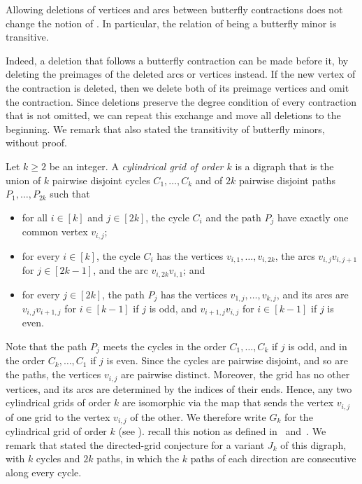 \documentclass[fontsize=12pt,leading=14pt]{fullpaper}
\begin{document}
\begin{observation}\label{par:butterfly-compose}
  Allowing deletions of vertices and arcs between butterfly contractions does not change the notion of .
  In particular, the relation of being a butterfly minor is transitive.
\end{observation}

Indeed, a deletion that follows a butterfly contraction can be made before it, by deleting the preimages of the deleted arcs or vertices instead.
If the new vertex of the contraction is deleted, then we delete both of its preimage vertices and omit the contraction.
Since deletions preserve the degree condition of every contraction that is not omitted, we can repeat this exchange and move all deletions to the beginning.
We remark that \textcite[Observation~4]{Reich26} also stated the transitivity of butterfly minors, without proof.

\begin{definition}\label{def:cyl-grid}
  Let $k\ge2$ be an integer.
  A \emph{cylindrical grid of order $k$} is a digraph that is the union of $k$ pairwise disjoint cycles $C_1,\dots,C_k$ and of $2k$ pairwise disjoint paths $P_1,\dots,P_{2k}$ such that
  \begin{itemize}
    \item for all $i\in[k]$ and $j\in[2k]$, the cycle $C_i$ and the path $P_j$ have exactly one common vertex $v_{i,j}$;
    \item for every $i\in[k]$, the cycle $C_i$ has the vertices $v_{i,1},\dots,v_{i,2k}$, the arcs $v_{i,j}v_{i,j+1}$ for $j\in[2k-1]$, and the arc $v_{i,2k}v_{i,1}$; and
    \item for every $j\in[2k]$, the path $P_j$ has the vertices $v_{1,j},\dots,v_{k,j}$, and its arcs are $v_{i,j}v_{i+1,j}$ for $i\in[k-1]$ if $j$ is odd, and $v_{i+1,j}v_{i,j}$ for $i\in[k-1]$ if $j$ is even.
  \end{itemize}
\end{definition}

Note that the path $P_j$ meets the cycles in the order $C_1,\dots,C_k$ if $j$ is odd, and in the order $C_k,\dots,C_1$ if $j$ is even.
Since the cycles are pairwise disjoint, and so are the paths, the vertices $v_{i,j}$ are pairwise distinct.
Moreover, the grid has no other vertices, and its arcs are determined by the indices of their ends.
Hence, any two cylindrical grids of order $k$ are isomorphic via the map that sends the vertex $v_{i,j}$ of one grid to the vertex $v_{i,j}$ of the other.
We therefore write $G_k$ for the cylindrical grid of order $k$ (see ).
\textcite{KawarabayashiK15} recall this notion as defined in~\cite{Reed97} and~\cite{Johnson2001}.
We remark that \textcite[Section~5]{Johnson2001} stated the directed-grid conjecture for a variant $J_k$ of this digraph, with $k$ cycles and $2k$ paths, in which the $k$ paths of each direction are consecutive along every cycle.
\end{document}
